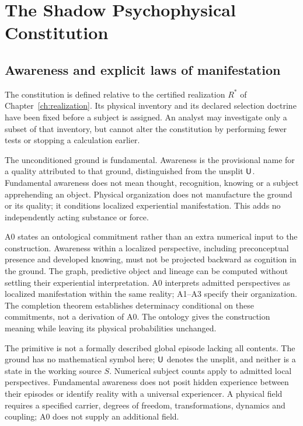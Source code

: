 \chapter{The Shadow Psychophysical Constitution}\label{ch:spc}
\section{Awareness and explicit laws of manifestation}\label{section:spc:the-primitive-and-the-realization-input}
The constitution is defined relative to the certified realization $R^\ast$ of Chapter~\ref{ch:realization}. Its physical inventory and its declared selection doctrine have been fixed before a subject is assigned. An analyst may investigate only a subset of that inventory, but cannot alter the constitution by performing fewer tests or stopping a calculation earlier.

\begin{constitution}\label{ax:A0}
The unconditioned ground is fundamental. Awareness is the provisional name for a quality attributed to that ground, distinguished from the unsplit $\mathsf{U}$. Fundamental awareness does not mean thought, recognition, knowing or a subject apprehending an object. Physical organization does not manufacture the ground or its quality; it conditions localized experiential manifestation. This adds no independently acting substance or force.
\end{constitution}
A0 states an ontological commitment rather than an extra numerical input to the construction. Awareness within a localized perspective, including preconceptual presence and developed knowing, must not be projected backward as cognition in the ground. The graph, predictive object and lineage can be computed without settling their experiential interpretation. A0 interprets admitted perspectives as localized manifestation within the same reality; A1--A3 specify their organization. The completion theorem establishes determinacy conditional on these commitments, not a derivation of A0. The ontology gives the construction meaning while leaving its physical probabilities unchanged.

The primitive is not a formally described global episode lacking all contents. The ground has no mathematical symbol here; $\mathsf{U}$ denotes the unsplit, and neither is a state in the working source $S$. Numerical subject counts apply to admitted local perspectives. Fundamental awareness does not posit hidden experience between their episodes or identify reality with a universal experiencer. A physical field requires a specified carrier, degrees of freedom, transformations, dynamics and coupling; A0 does not supply an additional field.

